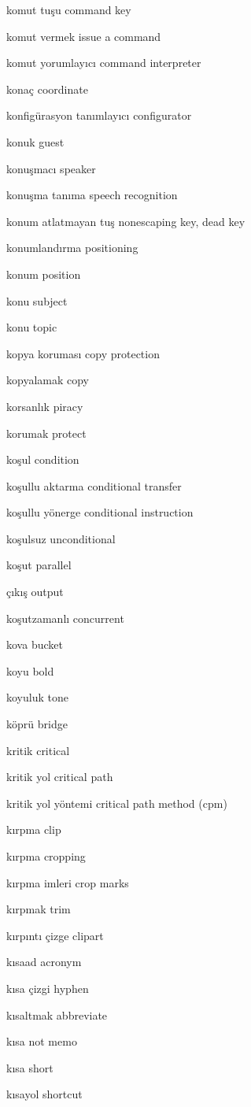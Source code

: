 \documentclass[12pt,fleqn]{article}\usepackage{../../common}
\begin{document}
komut tuşu command key

komut vermek issue a command

komut yorumlayıcı command interpreter

konaç coordinate

konfigürasyon tanımlayıcı configurator

konuk guest

konuşmacı speaker

konuşma tanıma speech recognition

konum atlatmayan tuş nonescaping key, dead key

konumlandırma positioning

konum position

konu subject

konu topic

kopya koruması copy protection

kopyalamak copy

korsanlık piracy

korumak protect

koşul condition

koşullu aktarma conditional transfer

koşullu yönerge conditional instruction

koşulsuz unconditional

koşut parallel

çıkış output

koşutzamanlı concurrent

kova bucket

koyu bold

koyuluk tone

köprü bridge

kritik critical

kritik yol critical path

kritik yol yöntemi critical path method (cpm)

kırpma clip

kırpma cropping

kırpma imleri crop marks

kırpmak trim

kırpıntı çizge clipart

kısaad acronym

kısa çizgi hyphen

kısaltmak abbreviate

kısa not memo

kısa short

kısayol shortcut
\end{document}
